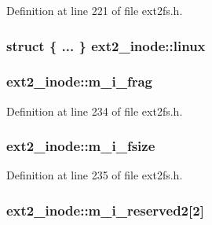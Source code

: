 \-Definition at line 221 of file ext2fs.\-h.

\hypertarget{structext2__inode_a505bf03fe36fa25ba3c015016b447146}{
\subsubsection[{linux}]{\setlength{\rightskip}{0pt plus 5cm}struct \{ ... \}   {\bf ext2\-\_\-inode\-::linux}}}\label{structext2__inode_a505bf03fe36fa25ba3c015016b447146}
\hypertarget{structext2__inode_abe6ee2cc317ede3dd3429cd1d92c8751}{
\subsubsection[{m\-\_\-i\-\_\-frag}]{ {\bf ext2\-\_\-inode\-::m\-\_\-i\-\_\-frag}}}\label{structext2__inode_abe6ee2cc317ede3dd3429cd1d92c8751}


\-Definition at line 234 of file ext2fs.\-h.

\hypertarget{structext2__inode_ad13c45ee88e9f4924ca265a2ab4bb668}{
\subsubsection[{m\-\_\-i\-\_\-fsize}]{ {\bf ext2\-\_\-inode\-::m\-\_\-i\-\_\-fsize}}}\label{structext2__inode_ad13c45ee88e9f4924ca265a2ab4bb668}


\-Definition at line 235 of file ext2fs.\-h.

\hypertarget{structext2__inode_a7ad0bd09fc3571dd677a76e8581857c3}{
\subsubsection[{m\-\_\-i\-\_\-reserved2}]{ {\bf ext2\-\_\-inode\-::m\-\_\-i\-\_\-reserved2}\mbox{[}2\mbox{]}}}\label{structext2__inode_a7ad0bd09fc3571dd677a76e8581857c3}


